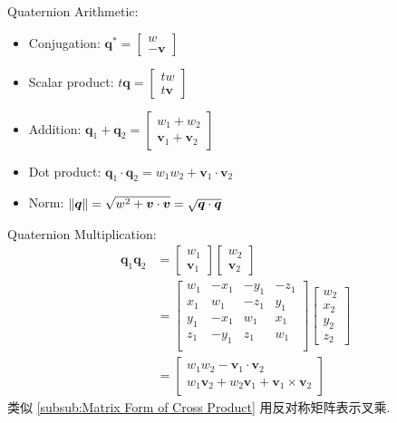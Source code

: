 Quaternion Arithmetic:
\begin{itemize}
    \item Conjugation: $\bm q^*=\begin{bmatrix}
        w\\ -\bm v
    \end{bmatrix}$
    \item Scalar product: $t\bm q = \begin{bmatrix}
        tw\\ t\bm v
    \end{bmatrix}$
    \item Addition: $\bm q_1 + \bm q_2= \begin{bmatrix}
        w_1+w_2\\ \bm v_1+\bm v_2
    \end{bmatrix}$
    \item Dot product: $\bm q_1\cdot \bm q_2 = w_1w_2+\bm v_1\cdot\bm v_2$
    \item Norm: $\left\lVert\bm q\right\rVert=\sqrt{w^2+\bm v\cdot \bm v}=\sqrt{\bm q \cdot \bm q}$
\end{itemize}

Quaternion Multiplication:
\begin{align*}
    \bm q_1\bm q_2&=\begin{bmatrix}
        w_1\\ \bm v_1
    \end{bmatrix}\begin{bmatrix}
        w_2\\ \bm v_2
    \end{bmatrix}\\
    &=\begin{bmatrix}
        w_1 & -x_1 & -y_1 & -z_1 \\
        x_1 &  w_1 & -z_1 &  y_1 \\
        y_1 & -x_1 &  w_1 &  x_1 \\
        z_1 & -y_1 &  z_1 &  w_1 \\
    \end{bmatrix}\begin{bmatrix}
        w_2\\x_2\\y_2\\z_2
    \end{bmatrix}\\
    &=\begin{bmatrix}
        w_1w_2-\bm v_1\cdot\bm v_2\\
        w_1\bm v_2+w_2\bm v_1+\bm v_1\times \bm v_2
    \end{bmatrix}
\end{align*}
类似 \ref{subsub:Matrix Form of Cross Product} 用反对称矩阵表示叉乘.

